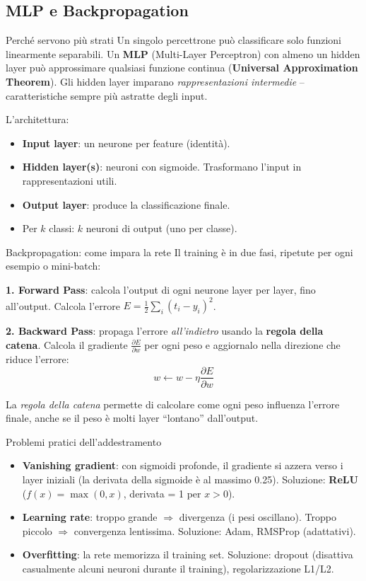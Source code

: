\documentclass[12pt,a4paper]{article}
\begin{document}
\subsection{MLP e Backpropagation}

\begin{narrativo}{Perché servono più strati}
Un singolo percettrone può classificare solo funzioni linearmente separabili. Un \textbf{MLP} (Multi-Layer Perceptron) con almeno un hidden layer può approssimare qualsiasi funzione continua (\textbf{Universal Approximation Theorem}). Gli hidden layer imparano \emph{rappresentazioni intermedie} -- caratteristiche sempre più astratte degli input.

L'architettura:
\begin{itemize}[noitemsep]
  \item \textbf{Input layer}: un neurone per feature (identità).
  \item \textbf{Hidden layer(s)}: neuroni con sigmoide. Trasformano l'input in rappresentazioni utili.
  \item \textbf{Output layer}: produce la classificazione finale.
  \item Per $k$ classi: $k$ neuroni di output (uno per classe).
\end{itemize}
\end{narrativo}

\begin{narrativo}{Backpropagation: come impara la rete}
Il training è in due fasi, ripetute per ogni esempio o mini-batch:

\textbf{1. Forward Pass}: calcola l'output di ogni neurone layer per layer, fino all'output. Calcola l'errore $E = \frac{1}{2}\sum_i (t_i - y_i)^2$.

\textbf{2. Backward Pass}: propaga l'errore \emph{all'indietro} usando la \textbf{regola della catena}. Calcola il gradiente $\frac{\partial E}{\partial w}$ per ogni peso e aggiornalo nella direzione che riduce l'errore:
\[
w \leftarrow w - \eta \frac{\partial E}{\partial w}
\]

La \emph{regola della catena} permette di calcolare come ogni peso influenza l'errore finale, anche se il peso è molti layer ``lontano'' dall'output.
\end{narrativo}

\begin{attenzione}{Problemi pratici dell'addestramento}
\begin{itemize}[noitemsep]
  \item \textbf{Vanishing gradient}: con sigmoidi profonde, il gradiente si azzera verso i layer iniziali (la derivata della sigmoide è al massimo 0.25). Soluzione: \textbf{ReLU} ($f(x) = \max(0,x)$, derivata = 1 per $x>0$).
  \item \textbf{Learning rate}: troppo grande $\Rightarrow$ divergenza (i pesi oscillano). Troppo piccolo $\Rightarrow$ convergenza lentissima. Soluzione: Adam, RMSProp (adattativi).
  \item \textbf{Overfitting}: la rete memorizza il training set. Soluzione: dropout (disattiva casualmente alcuni neuroni durante il training), regolarizzazione L1/L2.
\end{itemize}
\end{attenzione}
\end{document}
